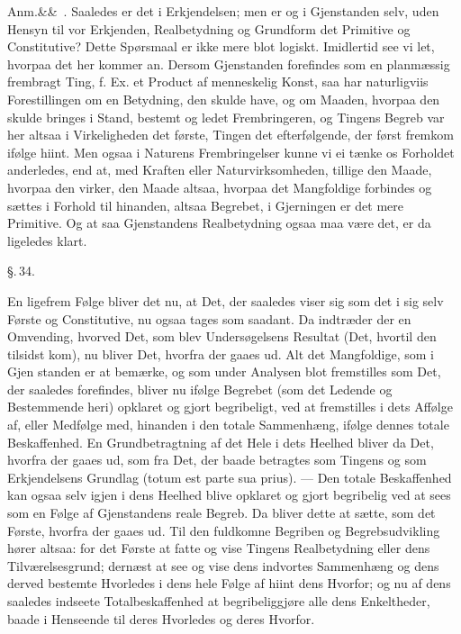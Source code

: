 \documentclass[12pt]{book}
\def\sperr#1{#1}%
\def\textit#1{#1}%
\def\emph#1{#1}%
\newcommand{\sperr}[1]{\textls[180]{#1}}
\newcommand{\parag}[1]{%
  \par\vspace{0.9\baselineskip}%
  {\centering\textit{\S.\,#1.}\par}%
  \vspace{0.35\baselineskip}%
  \noindent\hspace{\parindent}\ignorespaces
}
\newcommand{\anm}[1]{%
  \par\vspace{0.5\baselineskip}%
  \noindent\hspace{\parindent}\sperr{Anm.}\ifx&#1&\else~\textit{#1}.\fi
  \enspace\ignorespaces
}
\newcommand{\opage}[1]{\marginnote{\footnotesize\textit{[#1]}}}
\begin{document}
\opage{87} \anm{} Saaledes er det i Erkjendelsen; men er og i Gjenstanden selv, uden Hensyn
til vor Erkjenden, Realbetydning og Grundform det Primitive og Constitutive?
Dette Spørsmaal er ikke mere blot logiskt. Imidlertid see vi let, hvorpaa det her
kommer an. Dersom Gjenstanden forefindes som en planmæssig frembragt Ting, f. Ex.
et Product af menneskelig Konst, saa har naturligviis Forestillingen om en
Betydning, den skulde have, og om Maaden, hvorpaa den skulde bringes i Stand,
bestemt og ledet Frembringeren, og Tingens Begreb var her altsaa i Virkeligheden
det første, Tingen det efterfølgende, der først fremkom ifølge hiint. Men ogsaa i
Naturens Frembringelser kunne vi ei tænke os Forholdet anderledes, end at, med
Kraften eller Naturvirksomheden, tillige den Maade, hvorpaa den virker, den Maade
altsaa, hvorpaa det Mangfoldige forbindes og sættes i Forhold til hinanden,
altsaa Begrebet, i Gjerningen er det mere Primitive. Og at saa Gjenstandens
Realbetydning ogsaa maa være det, er da ligeledes klart.

\parag{34}

En ligefrem Følge bliver det nu, at Det, der saaledes viser sig som det i sig selv
Første og Constitutive, nu ogsaa tages som saadant. Da indtræder der en
Omvending, hvorved Det, som blev Undersøgelsens Resultat (Det, hvortil den
tilsidst kom), nu bliver Det, hvorfra der gaaes ud. Alt det Mangfoldige, som i
Gjen%
\opage{88}standen er at bemærke, og som under Analysen blot fremstilles som Det, der
saaledes forefindes, bliver nu ifølge Begrebet (som det Ledende og Bestemmende
heri) \emph{opklaret og gjort begribeligt}, ved at fremstilles i dets Affølge af,
eller Medfølge med, hinanden i den totale Sammenhæng, ifølge dennes totale
Beskaffenhed. En Grundbetragtning af det Hele i dets Heelhed bliver da Det,
hvorfra der gaaes ud, som fra Det, der baade betragtes som Tingens og som
Erkjendelsens Grundlag (\textit{totum est parte sua prius}). --- Den totale
Beskaffenhed kan ogsaa selv igjen i dens Heelhed blive opklaret og gjort
begribelig ved at sees som en Følge af Gjenstandens reale Begreb. Da bliver dette
at sætte, som det Første, hvorfra der gaaes ud. Til den fuldkomne Begriben og
Begrebsudvikling hører altsaa: for det Første at fatte og vise Tingens
Realbetydning eller dens Tilværelsesgrund; dernæst at see og vise dens indvortes
Sammenhæng og dens derved bestemte \emph{Hvorledes} i dens hele Følge af hiint
dens \emph{Hvorfor}; og nu af dens saaledes indseete Totalbeskaffenhed at
begribeliggjøre alle dens Enkeltheder, baade i Henseende til deres
\emph{Hvorledes} og deres \emph{Hvorfor}.
\end{document}
